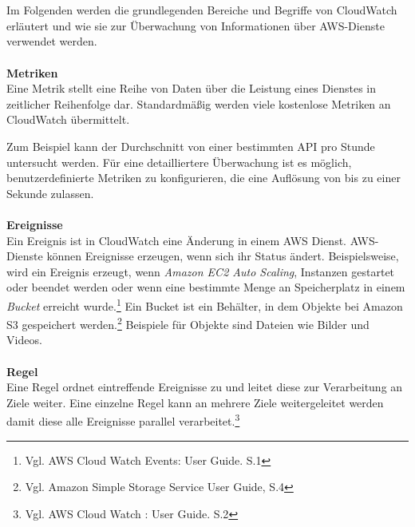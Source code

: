 \\\\
Im Folgenden werden die grundlegenden Bereiche und Begriffe von CloudWatch erläutert und wie sie zur Überwachung von Informationen über AWS-Dienste verwendet werden.
\\\\
\textbf{Metriken} \\
Eine Metrik stellt eine Reihe von Daten über die Leistung eines Dienstes in zeitlicher Reihenfolge dar. Standardmäßig werden viele kostenlose Metriken an CloudWatch übermittelt.

Zum Beispiel kann der Durchschnitt von einer bestimmten API pro Stunde untersucht werden. Für eine detailliertere Überwachung ist es möglich, benutzerdefinierte Metriken zu konfigurieren, die eine Auflösung von bis zu einer Sekunde zulassen. %
\\\\
\textbf{Ereignisse}\\
Ein Ereignis ist in CloudWatch eine Änderung in einem AWS Dienst. AWS-Dienste können Ereignisse erzeugen, wenn sich ihr Status ändert. %
Beispielsweise, wird ein Ereignis erzeugt, wenn \textit{Amazon EC2 Auto Scaling}, Instanzen gestartet oder beendet werden oder wenn eine bestimmte Menge an Speicherplatz in einem \textit{Bucket} erreicht wurde.\footnote{Vgl. AWS Cloud Watch Events: User Guide. S.1\cite{AMZ13}} Ein Bucket ist ein Behälter, in dem Objekte bei Amazon S3 gespeichert werden.\footnote{Vgl. Amazon Simple Storage Service User Guide, S.4\cite{AMZ18}} Beispiele für Objekte sind Dateien wie Bilder und Videos. 
\\\\
\textbf{Regel} \\
Eine Regel ordnet eintreffende Ereignisse zu und leitet diese zur Verarbeitung an Ziele weiter. Eine einzelne Regel kann an mehrere Ziele weitergeleitet werden damit diese alle Ereignisse parallel verarbeitet.\footnote{Vgl. AWS Cloud Watch : User Guide. S.2\cite{AMZ13}}
